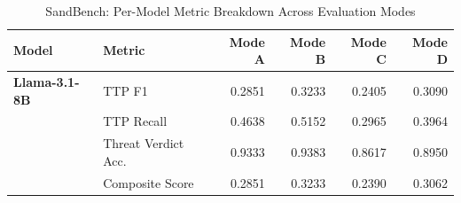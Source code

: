 \begin{table}[ht]
\centering
\caption{SandBench: Per-Model Metric Breakdown Across Evaluation Modes}
\label{tab:metric_breakdown}
\begin{tabular}{llrrrr}
\toprule
Model & Metric & Mode A & Mode B & Mode C & Mode D \\
\midrule
\textbf{Llama-3.1-8B} & TTP F1 & 0.2851 & 0.3233 & 0.2405 & 0.3090 \\
 & TTP Recall & 0.4638 & 0.5152 & 0.2965 & 0.3964 \\
 & Threat Verdict Acc. & 0.9333 & 0.9383 & 0.8617 & 0.8950 \\
 & Composite Score & 0.2851 & 0.3233 & 0.2390 & 0.3062 \\
\bottomrule
\end{tabular}
\end{table}